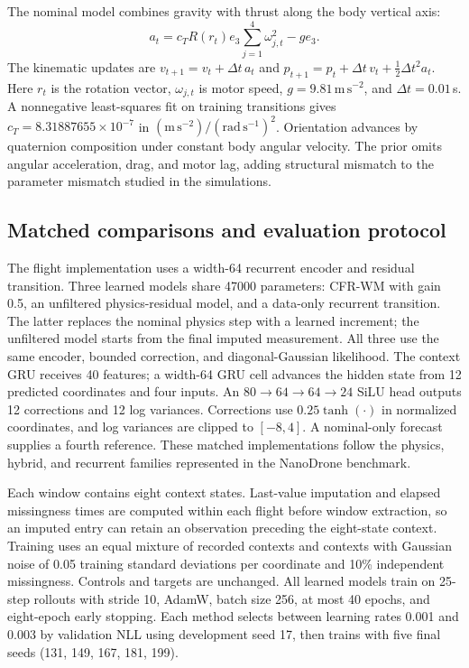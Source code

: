 \documentclass[pdflatex,sn-basic]{sn-jnl}
\newcommand{\ExternalLearnedParameters}{47000}
\begin{document}
The nominal model combines gravity with thrust along the body vertical axis:
\begin{equation}
 a_t=c_T R(r_t)e_3\sum_{j=1}^{4}\omega_{j,t}^{2}-g e_3.
 \label{eq:flight-prior}
\end{equation}
The kinematic updates are
$v_{t+1}=v_t+\Delta t\,a_t$ and
$p_{t+1}=p_t+\Delta t\,v_t+\tfrac12\Delta t^2a_t$.
Here $r_t$ is the rotation vector, $\omega_{j,t}$ is motor speed,
$g=9.81\,\mathrm{m\,s^{-2}}$, and $\Delta t=0.01$\,s. A nonnegative
least-squares fit on training transitions gives
$c_T=8.31887655\times10^{-7}$ in
$(\mathrm{m\,s^{-2}})/(\mathrm{rad\,s^{-1}})^2$.
Orientation advances by quaternion composition under constant body angular
velocity. The prior omits angular acceleration, drag, and motor lag, adding
structural mismatch to the parameter mismatch studied in the simulations.

\subsection{Matched comparisons and evaluation protocol}

The flight implementation uses a width-64 recurrent encoder and residual
transition. Three learned models share \ExternalLearnedParameters{} parameters:
CFR-WM with gain 0.5, an unfiltered physics-residual model, and a data-only
recurrent transition. The latter replaces the nominal physics step with a
learned increment; the unfiltered model starts from the final imputed
measurement. All three use the same encoder, bounded correction, and
diagonal-Gaussian likelihood. The context GRU receives 40 features; a
width-64 GRU cell advances the hidden state from 12 predicted coordinates and
four inputs. An $80\!\to\!64\!\to\!64\!\to\!24$ SiLU head outputs
12 corrections and 12 log variances. Corrections use $0.25\tanh(\cdot)$ in
normalized coordinates, and log variances are clipped to $[-8,4]$.
A nominal-only forecast supplies a fourth
reference. These matched implementations follow the physics, hybrid, and
recurrent families represented in the NanoDrone benchmark.

Each window contains eight context states. Last-value imputation and elapsed
missingness times are computed within each flight before window extraction,
so an imputed entry can retain an observation preceding the eight-state
context. Training uses an equal mixture of recorded contexts and contexts
with Gaussian noise of 0.05 training standard deviations per coordinate and
10\% independent missingness. Controls and targets are unchanged. All learned
models train on 25-step rollouts with stride 10, AdamW, batch size 256, at most
40 epochs, and eight-epoch early stopping. Each method selects between
learning rates 0.001 and 0.003 by validation NLL using development seed 17,
then trains with five final seeds (131, 149, 167, 181, 199).
\end{document}

